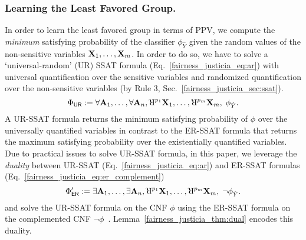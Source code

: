 \subsubsection{Learning the Least Favored Group.}
In order to learn the least favored group in terms of PPV, we  compute the \textit{minimum} satisfying probability of the classifier $ \phi_{\hat{Y}} $ given the random values of the non-sensitive variables $ \mathbf{X}_1, \dots, \mathbf{X}_m $. In order to do so, we have to solve a `universal-random' (UR) SSAT formula (Eq.~\eqref{fairness_justicia_eq:ar}) with  universal quantification over the sensitive variables and randomized quantification over the non-sensitive variables (by Rule 3, Sec.~\ref{fairness_justicia_sec:ssat}).
\begin{equation}
\Phi_{\mathsf{UR}} := \forall \sensitive_1,\dots, \forall \sensitive_n,
\R^{p_{1}}\nonsensitive_1, \dots, \R^{p_{m}}\nonsensitive_m,   \; \phi_{\hat{Y}}.
\label{fairness_justicia_eq:ar}
\end{equation}
A UR-SSAT formula returns the minimum satisfying probability of $ \phi $ over the universally quantified variables in contrast to the ER-SSAT formula that returns the maximum satisfying  probability over the existentially quantified variables.  
Due to practical issues to solve UR-SSAT formula, in this paper, we leverage the \textit{duality} between UR-SSAT (Eq.~\eqref{fairness_justicia_eq:ar}) and ER-SSAT formulas (Eq.~\eqref{fairness_justicia_eq:er_complement}) 
\begin{equation}
\Phi'_{\mathsf{ER}} := \exists \sensitive_1,\dots, \exists \sensitive_n,
\R^{p_{1}}\nonsensitive_1, \dots, \R^{p_{m}}\nonsensitive_m,   \; \neg \phi_{\hat{Y}}.
\label{fairness_justicia_eq:er_complement}
\end{equation}
and solve the UR-SSAT formula on the CNF $ \phi $ using the ER-SSAT formula on the complemented CNF $ \neg \phi $~\cite{littman2001stochastic}. Lemma~\ref{fairness_justicia_thm:dual} encodes this duality.
